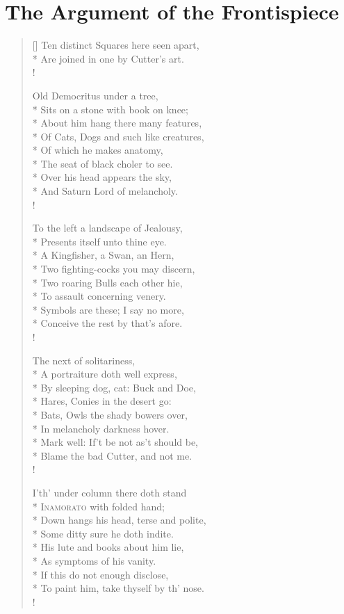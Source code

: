 \chapter{The Argument of the Frontispiece}
\label{ch:frontispiece}
\settowidth{\versewidth}{Of those black fumes which make it smart;}
\begin{verse}[\versewidth]
Ten distinct Squares here seen apart,\\*
Are joined in one by Cutter's art.\\!

Old Democritus under a tree,\\*
Sits on a stone with book on knee;\\*
About him hang there many features,\\*
Of Cats, Dogs and such like creatures,\\*
Of which he makes anatomy,\\*
The seat of black choler to see.\\*
Over his head appears the sky,\\*
And Saturn Lord of melancholy.\\!

To the left a landscape of Jealousy,\\*
Presents itself unto thine eye.\\*
A Kingfisher, a Swan, an Hern,\\*
Two fighting-cocks you may discern,\\*
Two roaring Bulls each other hie,\\*
To assault concerning venery.\\*
Symbols are these; I say no more,\\*
Conceive the rest by that's afore.\\!

The next of solitariness,\\*
A portraiture doth well express,\\*
By sleeping dog, cat: Buck and Doe,\\*
Hares, Conies in the desert go:\\*
Bats, Owls the shady bowers over,\\*
In melancholy darkness hover.\\*
Mark well: If't be not as't should be,\\*
Blame the bad Cutter, and not me.\\!

I'th' under column there doth stand\\*
\textsc{Inamorato} with folded hand;\\*
Down hangs his head, terse and polite,\\*
Some ditty sure he doth indite.\\*
His lute and books about him lie,\\*
As symptoms of his vanity.\\*
If this do not enough disclose,\\*
To paint him, take thyself by th' nose.\\!


\end{verse}
